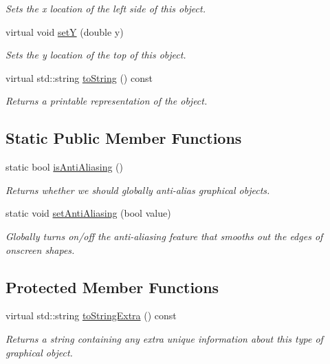\begin{DoxyCompactItemize}
\begin{DoxyCompactList}\small\item\em Sets the x location of the left side of this object. \end{DoxyCompactList}\item 
virtual void \mbox{\hyperlink{classsgl_1_1GObject_a7d57e2a5c35d27feb58fd498a3cf82b9}{setY}} (double y)
\begin{DoxyCompactList}\small\item\em Sets the y location of the top of this object. \end{DoxyCompactList}\item 
virtual std\+::string \mbox{\hyperlink{classsgl_1_1GObject_a1fe5121d6528fdea3f243321b3fa3a49}{to\+String}} () const
\begin{DoxyCompactList}\small\item\em Returns a printable representation of the object. \end{DoxyCompactList}\end{DoxyCompactItemize}
\subsection*{Static Public Member Functions}
\begin{DoxyCompactItemize}
\item 
static bool \mbox{\hyperlink{classsgl_1_1GObject_a93be0e1fe1b1bf1a1da732470c94f42b}{is\+Anti\+Aliasing}} ()
\begin{DoxyCompactList}\small\item\em Returns whether we should globally anti-\/alias graphical objects. \end{DoxyCompactList}\item 
static void \mbox{\hyperlink{classsgl_1_1GObject_a1e43371668ae850193cebedb44e1bbe3}{set\+Anti\+Aliasing}} (bool value)
\begin{DoxyCompactList}\small\item\em Globally turns on/off the anti-\/aliasing feature that smooths out the edges of onscreen shapes. \end{DoxyCompactList}\end{DoxyCompactItemize}
\subsection*{Protected Member Functions}
\begin{DoxyCompactItemize}
\item 
virtual std\+::string \mbox{\hyperlink{classsgl_1_1GObject_a4fcdf8de5c6de92242a975d83d8f23ea}{to\+String\+Extra}} () const
\begin{DoxyCompactList}\small\item\em Returns a string containing any extra unique information about this type of graphical object. \end{DoxyCompactList}\end{DoxyCompactItemize}
